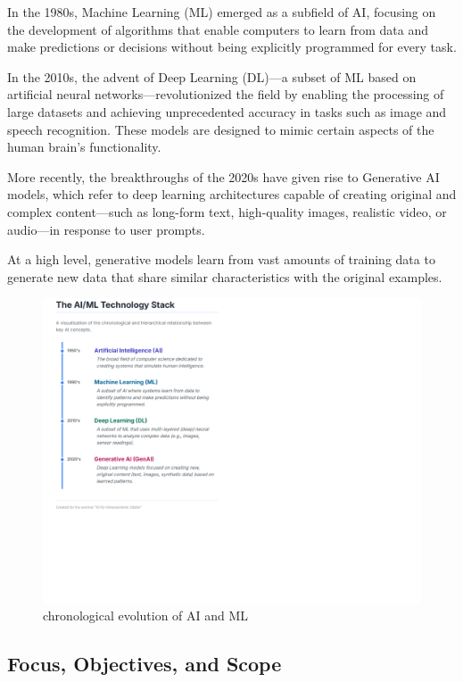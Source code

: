 \documentclass[12pt]{article}
\begin{document}
In the 1980s, Machine Learning (ML) emerged as a subfield of AI, focusing on the development of algorithms that enable computers 
to learn from data and make predictions or decisions without being explicitly programmed for every task.

In the 2010s, the advent of Deep Learning (DL)—a subset of ML based on artificial neural networks—revolutionized the field by 
enabling the processing of large datasets and achieving unprecedented accuracy in tasks such as image and speech recognition. 
These models are designed to mimic certain aspects of the human brain’s functionality.

More recently, the breakthroughs of the 2020s have given rise to Generative AI models, which refer to deep learning architectures 
capable of creating original and complex content—such as long-form text, high-quality images, realistic video, or audio—in response 
to user prompts.

At a high level, generative models learn from vast amounts of training data to generate new data that share similar characteristics 
with the original examples.

\begin{figure}[h]
    \centering
    \includegraphics[width=1\textwidth]{images/history_AI_1.png}
    \caption{chronological evolution of AI and ML}
    \label{fig:history_AI}
\end{figure}

\subsection{Focus, Objectives, and Scope}
\end{document}
